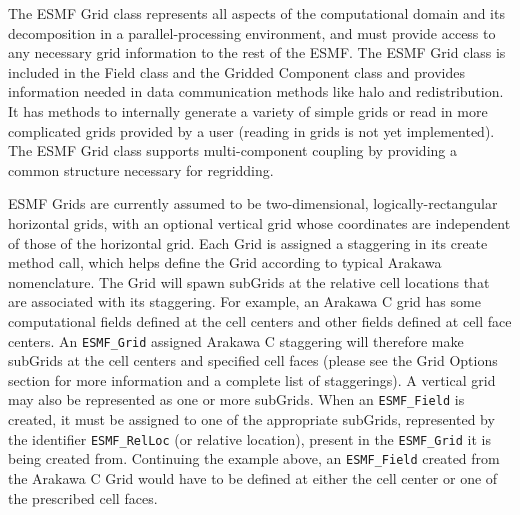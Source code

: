 %


The ESMF Grid class represents all aspects of the computational domain and its
decomposition in a parallel-processing environment, and must provide access to
any necessary grid information to the rest of the ESMF.  The ESMF Grid class
is included in the Field class and the Gridded Component class
and provides information needed in data communication methods like halo and
redistribution.  It has methods to internally generate a variety of
simple grids or read in more complicated grids provided by a user 
(reading in grids is not yet implemented).  The ESMF Grid class supports
multi-component coupling by providing a common structure necessary for regridding.

ESMF Grids are currently assumed to be two-dimensional, logically-rectangular
horizontal grids, with an optional vertical grid whose coordinates are
independent of those of the horizontal grid.  Each Grid is assigned a
staggering in its create method call, which helps define the Grid according
to typical Arakawa nomenclature.  The Grid will spawn subGrids at the relative
cell locations that are associated with its staggering.  For example, an
Arakawa C grid has some computational fields defined at the cell centers
and other fields defined at cell face centers.  An {\tt ESMF\_Grid} assigned
Arakawa C staggering will therefore make subGrids at the cell centers and
specified cell faces (please see the Grid Options section for more information
and a complete list of staggerings).  A vertical grid may also be represented
as one or more subGrids.  When an {\tt ESMF\_Field} is created, it must be
assigned to one of the appropriate subGrids, represented by the identifier
{\tt ESMF\_RelLoc} (or relative location), present in the {\tt ESMF\_Grid} it 
is being created from.  Continuing the example above, an {\tt ESMF\_Field}
created from the Arakawa C Grid would have to be defined at either the cell
center or one of the prescribed cell faces. 

